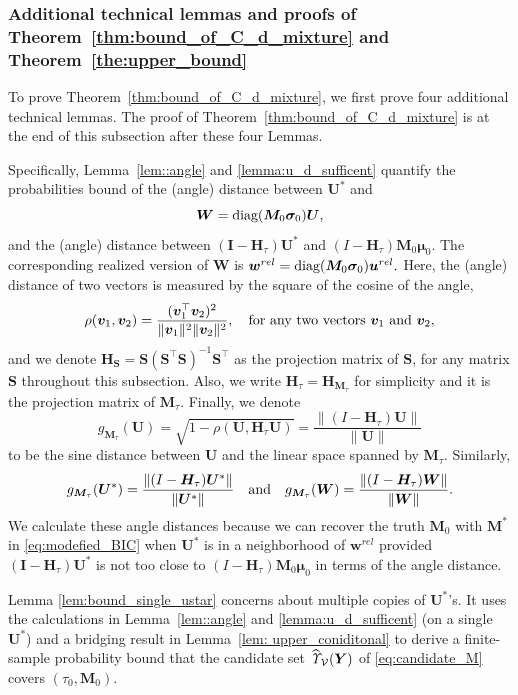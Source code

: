 \documentclass[12pt]{article}
\theoremstyle{shortspace}
\def\*#1{\bm{#1}}
\newcommand{\diag}{\hbox{diag}}
\begin{document}
\subsubsection{Additional technical lemmas and proofs of Theorem~\ref{thm:bound_of_C_d_mixture} and Theorem~\ref{the:upper_bound}} \label{sec:B3-2}


To prove Theorem~\ref{thm:bound_of_C_d_mixture}, we first prove four additional technical lemmas. 
The proof of Theorem~\ref{thm:bound_of_C_d_mixture} is at the end of this subsection after these four Lemmas. 


Specifically, Lemma~\ref{lem::angle} and \ref{lemma:u_d_sufficent} quantify the probabilities bound of the (angle) distance between   $\*U^*$ and 
$$
\*W = \diag(\*M_0\*\sigma_0) \*U,
$$
and the (angle) distance between $(\*I - \*H_\tau)\*U^* $ and $(I-\*H_{\tau})\*M_0\*\mu_0$. The corresponding realized version of $\*W$ is $\*w^{rel} = \diag(\*M_0\*\sigma_0) \*u^{rel}.$
Here,  
the (angle) distance of two vectors is measured by the square of the cosine of the angle, $$\rho(\*v_1, \*v_2) = \frac{(\*v^\top_1\*v_2)^2}{\|\*v_1\|^2\|\*v_2\|^2}, \quad \hbox{for any two vectors $\*v_1$ and $\*v_2$,}$$  
and we denote  $\*H_{\*S} = \*S (\*S^\top \*S)^{-1} \*S^\top$ as the projection matrix of $\*S$, for any matrix $\*S$ throughout this subsection.   Also, we write $\*H_\tau = \*H_{\*M_\tau}$ for simplicity
and it is the projection matrix of $\*M_\tau$. Finally, we denote 
$$
g_{\*M_\tau}(\*U)= \sqrt{1 - \rho(\*U, \*H_\tau\*U)} = \frac{\|(I-\*H_{\tau})\*U\|}{\|\*U\|}
$$ 
to be the sine distance between $\*U$ and the linear space spanned by $\*M_\tau.$ Similarly, $$
g_{\*M_\tau}(\*U^*) 
= \frac{\|(I-\*H_{\tau})\*U^*\|}{\|\*U^*\|}
\quad \hbox{and}  \quad
g_{\*M_\tau}(\*W)
= 
\frac{\|(I-\*H_{\tau})\*W\|}{\|\*W\|}.
$$  
We calculate these angle distances because
we can recover the truth $\*M_0$ with $\*M^*$ in \eqref{eq:modefied_BIC} when $\*U^*$ is in a neighborhood of $\*w^{rel}$ provided $(\*I - \*H_\tau)\*U^*$ is not too close to 
$(I-\*H_{\tau})\*M_0\*\mu_0$ in terms of the angle distance. 

Lemma \ref{lem:bound_single_ustar} concerns about multiple copies of $\*U^*$'s. It uses the calculations in  Lemma~\ref{lem::angle} and \ref{lemma:u_d_sufficent} (on a single $\*U^*$) and a bridging result in Lemma~\ref{lem: upper_coniditonal}
to derive a finite-sample probability bound that the candidate set $\widehat{\it \Upsilon}_{{\mathcal V}}(\*Y)$ of  \eqref{eq:candidate_M} covers $(\tau_0, \*M_0)$.
\end{document}
